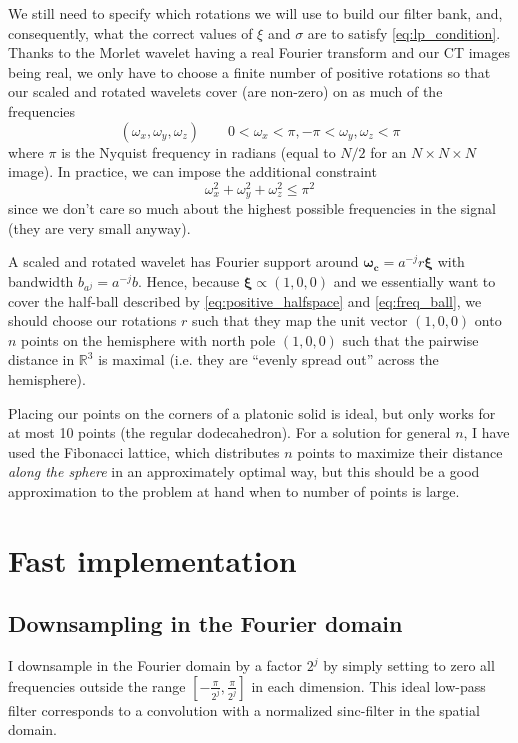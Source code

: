 \documentclass[twocolumn, openany, oneside, article]{memoir}
\begin{document}
We still need to specify which rotations we will use to build our filter bank, and, consequently, what the correct
values of $\xi$ and $\sigma$ are to satisfy \autoref{eq:lp_condition}. Thanks to the Morlet wavelet having a real
Fourier transform and our CT images being real, we only have to choose a finite number of positive rotations so that our
scaled and rotated wavelets cover (are non-zero) on as much of the frequencies
\begin{equation}\label{eq:positive_halfspace}
(\omega_x, \omega_y, \omega_z) \qquad 0 < \omega_x < \pi, -\pi < \omega_y, \omega_z < \pi
\end{equation}
where $\pi$ is the Nyquist frequency in radians (equal to $N/2$ for an $N \times N \times N$ image). In practice, we can
impose the additional constraint
\begin{equation}\label{eq:freq_ball}
    \omega_{x}^2 + \omega_{y}^2 + \omega_{z}^2 \leq \pi^2
\end{equation}
since we don't care so much about the highest possible frequencies in the signal (they are very small anyway).

A scaled and rotated wavelet has Fourier support around $\bm{\omega_c} = a^{-j}r\bm{\xi}$ with bandwidth $b_{a^j} =
a^{-j}b$. Hence, because $\bm{\xi} \propto (1, 0, 0)$ and we essentially want to cover the half-ball described by
\autoref{eq:positive_halfspace} and \autoref{eq:freq_ball}, we should choose our rotations $r$ such that they map the
unit vector $(1, 0, 0)$ onto $n$ points on the hemisphere with north pole $(1, 0, 0)$ such that the pairwise distance in
$\mathbb{R}^3$ is maximal (i.e. they are \enquote{evenly spread out} across the hemisphere).

Placing our points on the corners of a platonic solid is ideal, but only works for at most 10 points (the regular
dodecahedron). For a solution for general $n$, I have used the Fibonacci lattice, which distributes $n$ points to
maximize their distance \emph{along the sphere} in an approximately optimal way, but this should be a good approximation
to the problem at hand when to number of points is large.



\appendix

\chapter{Fast implementation}

\section{Downsampling in the Fourier domain}
I downsample in the Fourier domain by a factor $2^j$ by simply setting to zero all frequencies
outside the range $[-\frac{\pi}{2^j}, \frac{\pi}{2^j}]$ in each dimension. This ideal low-pass filter corresponds to a
convolution with a normalized sinc-filter in the spatial domain.
\end{document}
